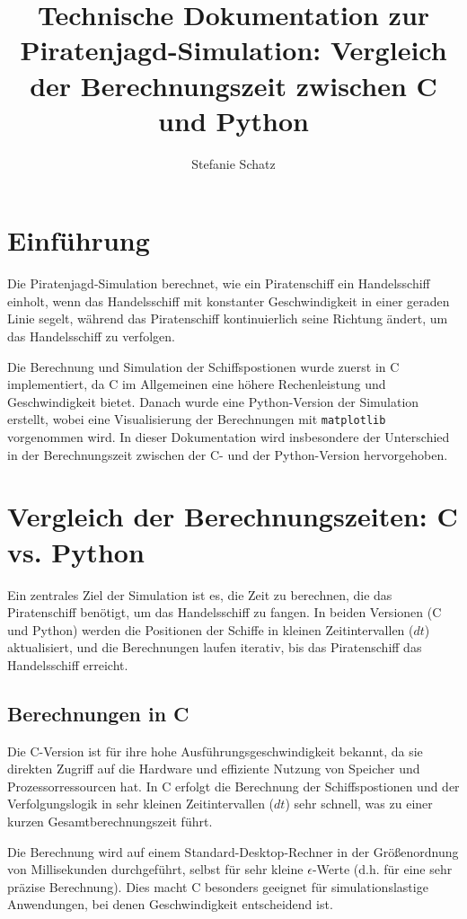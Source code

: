 \documentclass[10pt]{article} %
\title{Technische Dokumentation zur Piratenjagd-Simulation: Vergleich der Berechnungszeit zwischen C und Python}
\author{Stefanie Schatz}
\date{} %
\begin{document}
\maketitle

\section{Einführung}
Die Piratenjagd-Simulation berechnet, wie ein Piratenschiff ein Handelsschiff einholt, wenn das Handelsschiff mit konstanter Geschwindigkeit in einer geraden Linie segelt, während das Piratenschiff kontinuierlich seine Richtung ändert, um das Handelsschiff zu verfolgen. 

Die Berechnung und Simulation der Schiffspostionen wurde zuerst in C implementiert, da C im Allgemeinen eine höhere Rechenleistung und Geschwindigkeit bietet. Danach wurde eine Python-Version der Simulation erstellt, wobei eine Visualisierung der Berechnungen mit \texttt{matplotlib} vorgenommen wird. In dieser Dokumentation wird insbesondere der Unterschied in der Berechnungszeit zwischen der C- und der Python-Version hervorgehoben.

\section{Vergleich der Berechnungszeiten: C vs. Python}
Ein zentrales Ziel der Simulation ist es, die Zeit zu berechnen, die das Piratenschiff benötigt, um das Handelsschiff zu fangen. In beiden Versionen (C und Python) werden die Positionen der Schiffe in kleinen Zeitintervallen (\( dt \)) aktualisiert, und die Berechnungen laufen iterativ, bis das Piratenschiff das Handelsschiff erreicht.

\subsection{Berechnungen in C}
Die C-Version ist für ihre hohe Ausführungsgeschwindigkeit bekannt, da sie direkten Zugriff auf die Hardware und effiziente Nutzung von Speicher und Prozessorressourcen hat. In C erfolgt die Berechnung der Schiffspostionen und der Verfolgungslogik in sehr kleinen Zeitintervallen (\( dt \)) sehr schnell, was zu einer kurzen Gesamtberechnungszeit führt.

Die Berechnung wird auf einem Standard-Desktop-Rechner in der Größenordnung von Millisekunden durchgeführt, selbst für sehr kleine \( \epsilon \)-Werte (d.h. für eine sehr präzise Berechnung). Dies macht C besonders geeignet für simulationslastige Anwendungen, bei denen Geschwindigkeit entscheidend ist.
\end{document}
